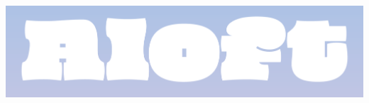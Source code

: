 \documentclass[a5paper, DIV=18, 12pt]{scrartcl}
\begin{document}
\vspace{-1ex}
\begin{center}
\includegraphics[width=\textwidth]{Images/aloft_banner.png}
\end{center}
\vspace{-0.0ex}
\end{document}
